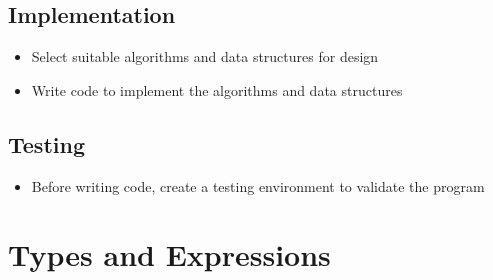 \documentclass{article}
\begin{document}
\subsection{Implementation}
\begin{itemize}
    \item Select suitable algorithms and data structures for design
    \item Write code to implement the algorithms and data structures
\end{itemize}
\subsection{Testing}
\begin{itemize}
    \item Before writing code, create a testing environment to validate
          the program
\end{itemize}
\section{Types and Expressions}
\end{document}

